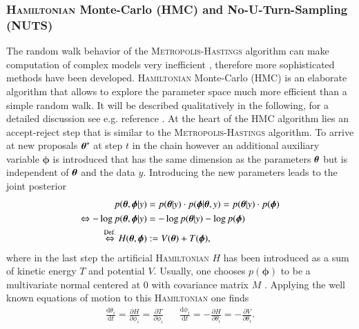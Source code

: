 \subsubsection{\textsc{Hamiltonian} Monte-Carlo (HMC) and No-U-Turn-Sampling (NUTS)}
The random walk behavior of the \textsc{Metropolis-Hastings} algorithm can make computation of complex models very inefficient \cite{bayes}, therefore more sophisticated methods have been developed. \textsc{Hamiltonian} Monte-Carlo (HMC) \cite{hmc} is an elaborate algorithm that allows to explore the parameter space much more efficient than a simple random walk. It will be described qualitatively in the following, for a detailed discussion see e.g. reference \cite{bayes}. At the heart of the HMC algorithm lies an accept-reject step that is similar to the \textsc{Metropolis-Hastings} algorithm. To arrive at new proposals $\boldsymbol{\theta}^*$ at step $t$ in the chain however an additional auxiliary variable $\boldsymbol{\phi}$ is introduced that has the same dimension as the parameters $\boldsymbol{\theta}$ but is independent of $\boldsymbol{\theta}$ and the data $y$. Introducing the new parameters leads to the joint posterior \cite{stan} 
\begin{equation}
	\begin{aligned}
		p(\boldsymbol{\theta},\boldsymbol{\phi}|y)&=p(\boldsymbol{\theta}|y)\cdot p(\boldsymbol{\phi}|\boldsymbol{\theta},y)=p(\boldsymbol{\theta}|y)\cdot p(\boldsymbol{\phi})\\
		\Leftrightarrow-\log p(\boldsymbol{\theta},\boldsymbol{\phi}|y)&=-\log p(\boldsymbol{\theta}|y)-\log p(\boldsymbol{\phi})\\
		\overset{\text{Def.}}{\Leftrightarrow} H(\boldsymbol{\theta},\boldsymbol{\phi}) &:=V(\boldsymbol{\theta})+T(\boldsymbol{\phi}), 	
	\end{aligned}
\end{equation} 
where in the last step the artificial \textsc{Hamiltonian} $H$ has been introduced as a sum of kinetic energy $T$ and potential $V$. Usually, one chooses $p(\boldsymbol{\phi})$ to be a multivariate normal centered at $0$ with covariance matrix $M$ \cite{bayes}. Applying the well known equations of motion to this \textsc{Hamiltonian} one finds 
\begin{align}
	\frac{\text{d}\theta_i}{\text{d}t}=\frac{\partial H}{\partial \phi_i}=\frac{\partial T}{\partial \phi_i} && \frac{\text{d}\phi_i}{\text{d}t}=-\frac{\partial H}{\partial \theta_i}=-\frac{\partial V}{\partial \theta_i}.
\end{align}
